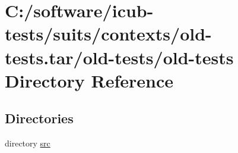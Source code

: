 \section{C\+:/software/icub-\/tests/suits/contexts/old-\/tests.tar/old-\/tests/old-\/tests Directory Reference}
\label{dir_993e1fa3ddb1ed97768e551ae0127669}
\subsection*{Directories}
\begin{DoxyCompactItemize}
\item 
directory \hyperlink{dir_490185706ad5d2aa135c9c014404c2f8}{src}
\end{DoxyCompactItemize}
